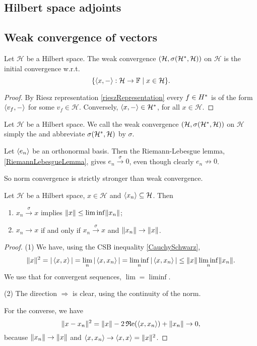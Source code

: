 \subsection{Hilbert space adjoints}

\subsection{Weak convergence of vectors}
\begin{lemma}
Let $\mathcal{H}$ be a Hilbert space. The weak convergence $\sSet{\mathcal{H}, \sigma(\dual{\mathcal{H}}, \mathcal{H})}$ on $\mathcal{H}$ is the initial convergence w.r.t.
\[ \setbuilder{\inner{x,-}: \mathcal{H}\to \F}{x\in\mathcal{H}}. \]
\end{lemma}
\begin{proof}
By Riesz representation \ref{rieszRepresentation} every $f\in {H}^*$ is of the form $\left\langle v_f, - \right\rangle$ for some $v_f\in \mathcal{H}$. Conversely, $\left\langle x,- \right\rangle\in {\mathcal{H}}^*$, for all $x\in \mathcal{H}$.
\end{proof}
\begin{definition}
Let $\mathcal{H}$ be a Hilbert space. We call the weak convergence $\sSet{\mathcal{H}, \sigma(\dual{\mathcal{H}}, \mathcal{H})}$ on $\mathcal{H}$ simply the  and abbreviate $\sigma({\mathcal{H}}^*, \mathcal{H})$ by $\sigma$.
\end{definition}

\begin{example}
Let $\left\langle e_n \right\rangle$ be an orthonormal basis. Then the Riemann-Lebesgue lemma, \ref{RiemannLebesgueLemma}, gives $e_n \overset{\sigma}{\longrightarrow} 0$, even though clearly $e_n \not\to 0$.
\end{example}

So norm convergence is strictly stronger than weak convergence.

\begin{proposition} \label{weakHilbertSpaceConvergence}
Let $\mathcal{H}$ be a Hilbert space, $x\in \mathcal{H}$ and $\left\langle x_n \right\rangle\subseteq \mathcal{H}$. Then
\begin{enumerate}
\item $x_n \overset{\sigma}{\longrightarrow} x$ implies $\lVert x\rVert \leq \liminf \lVert x_n\rVert$;
\item $x_n \longrightarrow x$ \textup{if and only if} $x_n \overset{\sigma}{\longrightarrow} x$ and $\lVert x_n\rVert\to \lVert x\rVert$.
\end{enumerate}
\end{proposition}
\begin{proof}
(1) We have, using the CSB inequality \ref{CauchySchwarz},
\[ \lVert x\rVert^2 = |\left\langle x,x \right\rangle| = \lim_n |\left\langle x,x_n \right\rangle| = \liminf_n|\left\langle x,x_n \right\rangle| \leq \lVert x\rVert\liminf_n\lVert x_n\rVert. \]
We use that for convergent sequences, $\lim = \liminf$.

(2) The direction $\Rightarrow$ is clear, using the continuity of the norm.

For the converse, we have
\[ \lVert x-x_n\rVert^2 = \lVert x\rVert-2\operatorname{\mathfrak{R}e}(\left\langle x,x_n \right\rangle) + \lVert x_n\rVert \to 0, \]
because $\lVert x_n\rVert \to \lVert x\rVert$ and $\left\langle x,x_n \right\rangle \to \left\langle x,x \right\rangle = \lVert x\rVert^2$.
\end{proof}


